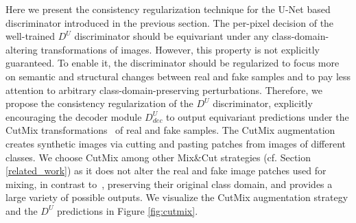 \documentclass[10pt,twocolumn,letterpaper]{article}
\begin{document}
Here we present the consistency regularization technique for the U-Net based discriminator introduced in the previous section. The per-pixel decision of the well-trained $D^U$ discriminator should be equivariant under any class-domain-altering transformations of images. However, this property is not explicitly guaranteed.
To enable it, the discriminator should be regularized to focus more on semantic and structural changes between real and fake samples and to pay less attention to arbitrary class-domain-preserving perturbations.
Therefore, we propose
the consistency regularization of the $D^U$
discriminator, explicitly encouraging the decoder module $D^U_{dec}$ to output equivariant predictions under the
CutMix transformations~\cite{Yun2019CutMixRS} of real and fake samples.
The CutMix augmentation creates synthetic images via cutting and pasting patches from images of different classes.
We choose CutMix among other Mix\&Cut strategies (cf. Section \ref{related_work}) as it does not alter the real and fake image patches used for mixing, in contrast to~\cite{zhang2018mixup}, preserving their original class domain, and provides a large variety of possible outputs. We visualize the CutMix augmentation strategy and the $D^U$ predictions in Figure \ref{fig:cutmix}.
\end{document}
